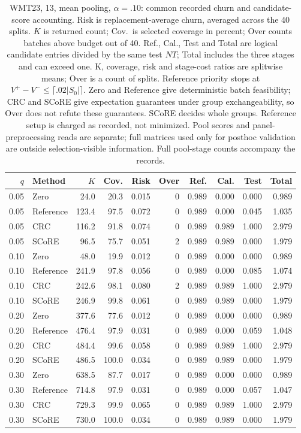\begin{table}[t]
\centering\small
\setlength{\tabcolsep}{4pt}
\begin{tabular}{rlrrrrrrrr}
\toprule
$q$ & Method & $K$ & Cov. & Risk & Over & Ref. & Cal. & Test & Total \\
\midrule
0.05 & Zero & 24.0 & 20.3 & 0.015 & 0 & 0.989 & 0.000 & 0.000 & 0.989 \\
0.05 & Reference & 123.4 & 97.5 & 0.072 & 0 & 0.989 & 0.000 & 0.045 & 1.035 \\
0.05 & CRC & 116.2 & 91.8 & 0.074 & 0 & 0.989 & 0.989 & 1.000 & 2.979 \\
0.05 & SCoRE & 96.5 & 75.7 & 0.051 & 2 & 0.989 & 0.989 & 0.000 & 1.979 \\
0.10 & Zero & 48.0 & 19.9 & 0.012 & 0 & 0.989 & 0.000 & 0.000 & 0.989 \\
0.10 & Reference & 241.9 & 97.8 & 0.056 & 0 & 0.989 & 0.000 & 0.085 & 1.074 \\
0.10 & CRC & 242.6 & 98.1 & 0.080 & 2 & 0.989 & 0.989 & 1.000 & 2.979 \\
0.10 & SCoRE & 246.9 & 99.8 & 0.061 & 0 & 0.989 & 0.989 & 0.000 & 1.979 \\
0.20 & Zero & 377.6 & 77.6 & 0.012 & 0 & 0.989 & 0.000 & 0.000 & 0.989 \\
0.20 & Reference & 476.4 & 97.9 & 0.031 & 0 & 0.989 & 0.000 & 0.059 & 1.048 \\
0.20 & CRC & 484.4 & 99.6 & 0.058 & 0 & 0.989 & 0.989 & 1.000 & 2.979 \\
0.20 & SCoRE & 486.5 & 100.0 & 0.034 & 0 & 0.989 & 0.989 & 0.000 & 1.979 \\
0.30 & Zero & 638.5 & 87.7 & 0.017 & 0 & 0.989 & 0.000 & 0.000 & 0.989 \\
0.30 & Reference & 714.8 & 97.9 & 0.031 & 0 & 0.989 & 0.000 & 0.057 & 1.047 \\
0.30 & CRC & 729.3 & 99.9 & 0.065 & 0 & 0.989 & 0.989 & 1.000 & 2.979 \\
0.30 & SCoRE & 730.0 & 100.0 & 0.034 & 0 & 0.989 & 0.989 & 0.000 & 1.979 \\
\bottomrule
\end{tabular}
\caption{WMT23, 13, mean pooling, $\alpha=.10$: common recorded churn and candidate-score accounting. Risk is replacement-average churn, averaged across the 40 splits. $K$ is returned count; Cov.\ is selected coverage in percent; Over counts batches above budget out of 40. Ref., Cal., Test and Total are logical candidate entries divided by the same test $NT$; Total includes the three stages and can exceed one. K, coverage, risk and stage-cost ratios are splitwise means; Over is a count of splits. Reference priority stops at $V^+-V^-\le\lceil.02|S_0|\rceil$. Zero and Reference give deterministic batch feasibility; CRC and SCoRE give expectation guarantees under group exchangeability, so Over does not refute these guarantees. SCoRE decides whole groups. Reference setup is charged as recorded, not minimized. Pool scores and panel-preprocessing reads are separate; full matrices used only for posthoc validation are outside selection-visible information. Full pool-stage counts accompany the records.}
\label{tab:common-WMT23-mean}
\end{table}

